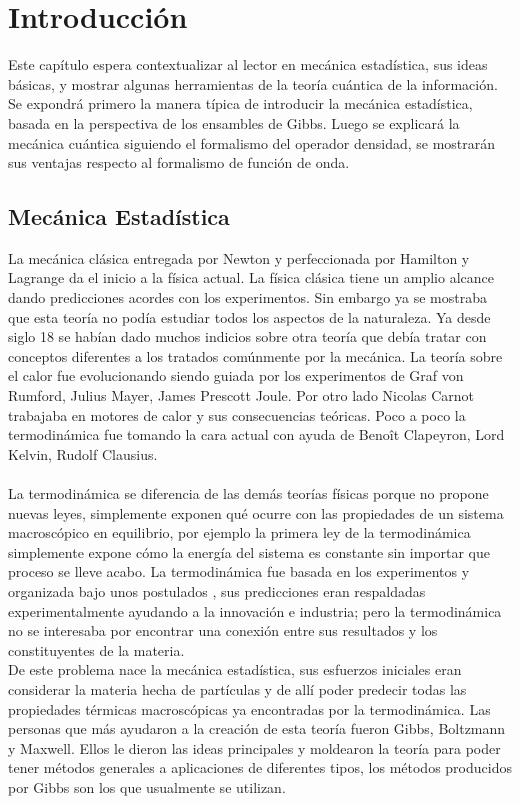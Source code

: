 \chapter{Introducción}

Este capítulo espera contextualizar al lector en mecánica estadística, sus ideas básicas, y mostrar algunas herramientas de la teoría cuántica de la información. Se expondrá  primero la manera típica de introducir la mecánica estadística, basada en la perspectiva de los ensambles de Gibbs. Luego se explicará la mecánica cuántica siguiendo el formalismo del operador densidad, se mostrarán sus ventajas respecto al formalismo de función de onda.


\section{Mecánica Estadística}
La mecánica clásica entregada por Newton y perfeccionada por Hamilton y Lagrange da el inicio a la física actual. La física clásica tiene un amplio alcance dando predicciones acordes con los experimentos. Sin embargo ya se mostraba que esta teoría no podía estudiar todos los aspectos de la naturaleza. Ya desde siglo 18 se habían dado muchos indicios sobre otra teoría que debía tratar con conceptos diferentes a los tratados comúnmente por la mecánica. La teoría sobre el calor fue evolucionando siendo guiada por los experimentos de Graf von Rumford, Julius Mayer, James Prescott Joule. Por otro lado Nicolas Carnot trabajaba en motores de calor y sus consecuencias teóricas. Poco a poco la termodinámica fue tomando la cara actual con ayuda de Benoît Clapeyron, Lord Kelvin, Rudolf Clausius. 
\\
\\
La termodinámica se diferencia de las demás teorías físicas porque no propone nuevas leyes, simplemente exponen qué ocurre con las propiedades de un sistema macroscópico en equilibrio, por ejemplo la primera ley de la termodinámica simplemente expone cómo la energía del sistema es constante sin importar que proceso se lleve acabo. La termodinámica fue basada en los experimentos y organizada bajo unos postulados \cite{CallenThermo}, sus predicciones eran respaldadas experimentalmente ayudando a la innovación e industria; pero la termodinámica no se interesaba por encontrar una conexión entre sus resultados y los constituyentes de la materia.\\
De este problema nace la mecánica estadística, sus esfuerzos iniciales eran considerar la materia hecha de partículas y de allí poder predecir todas las propiedades térmicas macroscópicas ya encontradas por la termodinámica. Las personas que más ayudaron a la creación de esta teoría fueron Gibbs, Boltzmann y Maxwell. Ellos le dieron las ideas principales y moldearon la teoría para poder tener métodos generales a aplicaciones de diferentes tipos, los métodos producidos por Gibbs son los que usualmente se utilizan.
